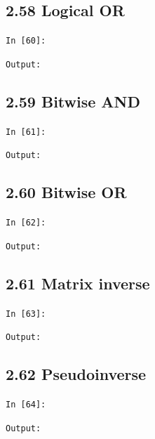 \documentclass[11pt]{article}
\begin{document}
\par\medskip\noindent\begin{minipage}{\linewidth}
\subsection*{2.58 Logical OR}
\noindent\texttt{In [60]:}

\noindent\texttt{Output:}

\end{minipage}\par

\par\medskip\noindent\begin{minipage}{\linewidth}
\subsection*{2.59 Bitwise AND}
\noindent\texttt{In [61]:}

\noindent\texttt{Output:}

\end{minipage}\par

\par\medskip\noindent\begin{minipage}{\linewidth}
\subsection*{2.60 Bitwise OR}
\noindent\texttt{In [62]:}

\noindent\texttt{Output:}

\end{minipage}\par

\par\medskip\noindent\begin{minipage}{\linewidth}
\subsection*{2.61 Matrix inverse}
\noindent\texttt{In [63]:}

\noindent\texttt{Output:}

\end{minipage}\par

\par\medskip\noindent\begin{minipage}{\linewidth}
\subsection*{2.62 Pseudoinverse}
\noindent\texttt{In [64]:}

\noindent\texttt{Output:}

\end{minipage}\par
\end{document}
